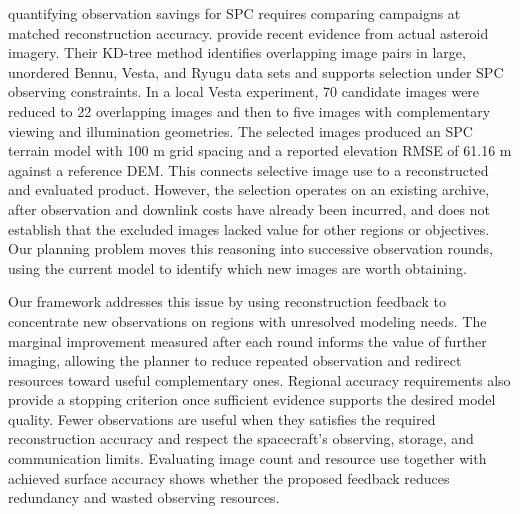 quantifying observation savings for SPC requires comparing campaigns at matched reconstruction accuracy.\citet{zhang2025imagepairs} provide recent evidence from actual asteroid imagery. Their KD-tree method identifies overlapping image pairs in large, unordered Bennu, Vesta, and Ryugu data sets and supports selection under SPC observing constraints. In a local Vesta experiment, 70 candidate images were reduced to 22 overlapping images and then to five images with complementary viewing and illumination geometries. The selected images produced an SPC terrain model with 100 m grid spacing and a reported elevation RMSE of 61.16 m against a reference DEM. This connects selective image use to a reconstructed and evaluated product. However, the selection operates on an existing archive, after observation and downlink costs have already been incurred, and does not establish that the excluded images lacked value for other regions or objectives. Our planning problem moves this reasoning into successive observation rounds, using the current model to identify which new images are worth obtaining.

Our framework addresses this issue by using reconstruction feedback to concentrate new observations on regions with unresolved modeling needs. The marginal improvement measured after each round informs the value of further imaging, allowing the planner to reduce repeated observation and redirect resources toward useful complementary ones. Regional accuracy requirements also provide a stopping criterion once sufficient evidence supports the desired model quality. Fewer observations are useful when they satisfies the required reconstruction accuracy and respect the spacecraft's observing, storage, and communication limits. Evaluating image count and resource use together with achieved surface accuracy shows whether the proposed feedback reduces redundancy and wasted observing resources.
